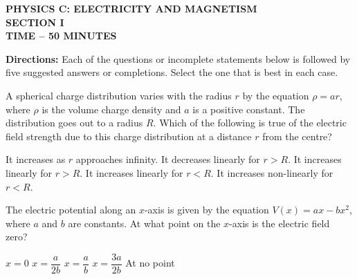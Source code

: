 \documentclass[12pt]{../../oss-apphys-exam}
\begin{document}
\begin{center}
  {
    \Large
    \textbf{PHYSICS C: ELECTRICITY AND MAGNETISM\\SECTION I\\
      TIME -- 50 MINUTES}
  }
\end{center}

\textbf{Directions:} Each of the questions or incomplete statements below is
followed by five suggested answers or completions. Select the one that is best
in each case.

\begin{questions}

  \question A spherical charge distribution varies with the radius $r$ by the
  equation $\rho=ar$, where $\rho$ is the volume charge density and $a$ is a
  positive constant. The distribution goes out to a radius $R$. Which of the
  following is true of the electric field strength due to this charge
  distribution at a distance $r$ from the centre?
  \begin{choices}
    \choice It increases as $r$ approaches infinity.
    \choice It decreases linearly for $r>R$.
    \choice It increases linearly for $r>R$.
    \choice It increases linearly for $r<R$.
    \choice It increases non-linearly for $r<R$.
  \end{choices}
  \newpage
  
  \question The electric potential along an $x$-axis is given by the equation
  $V(x)=ax-bx^2$, where $a$ and $b$ are constants. At what point on the
  $x$-axis is the electric field zero?
  \begin{choices}
    \choice $x=0$
    \choice $x=\dfrac a{2b}$
    \choice $x=\dfrac ab$
    \choice $x=\dfrac{3a}{2b}$
    \choice At no point
  \end{choices}
  \newpage

  \uplevel{
    \centering

}
\end{questions}
\end{document}
